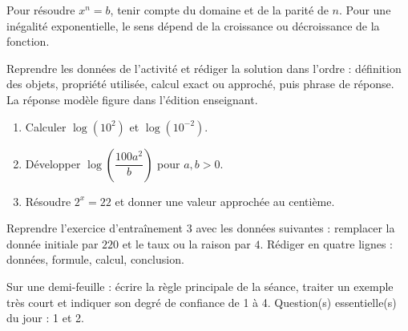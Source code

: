 \begin{traceecrite}Pour résoudre $x^n=b$, tenir compte du domaine et de la parité de $n$. Pour une inégalité exponentielle, le sens dépend de la croissance ou décroissance de la fonction.\end{traceecrite}

\begin{exemple}
Reprendre les données de l'activité et rédiger la solution dans l'ordre : définition des objets, propriété utilisée, calcul exact ou approché, puis phrase de réponse. La réponse modèle figure dans l'édition enseignant.
\end{exemple}

\begin{exercice}[-- essentiel]
\begin{enumerate}\item Calculer $\log(10^2)$ et $\log(10^{-2})$.\item Développer $\log\!\left(\dfrac{100a^2}{b}\right)$ pour $a,b>0$.\item Résoudre $2^x=22$ et donner une valeur approchée au centième.\end{enumerate}
\end{exercice}


\begin{dm}Reprendre l'exercice d'entraînement 3 avec les données suivantes : remplacer la donnée initiale par $220$ et le taux ou la raison par $4$. Rédiger en quatre lignes : données, formule, calcul, conclusion.\end{dm}

\begin{sortie}Sur une demi-feuille : écrire la règle principale de la séance, traiter un exemple très court et indiquer son degré de confiance de 1 à 4. Question(s) essentielle(s) du jour : 1 et 2.\end{sortie}

